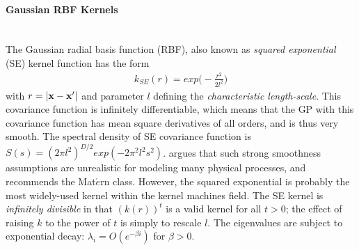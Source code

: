 \documentclass[11pt]{article}
\begin{document}
\paragraph{Gaussian RBF Kernels}\mbox{}\\
The Gaussian radial basis function (RBF), also known as \textsl{squared exponential} (SE) kernel function has the form
\begin{align*}
k_{SE}(r)=exp\Big(-\frac{r^2}{2l^2}\Big)
\end{align*}
with $r=|{\bf x}-{\bf x}'|$ and parameter $l$ defining the \textsl{characteristic length-scale}. This covariance function is infinitely differentiable, which means that the GP with this covariance function has mean square derivatives of all orders, and is thus very smooth. The spectral density of SE covariance function is $S(s)=(2\pi l^2)^{D/2}exp(-2\pi^2l^2s^2)$. \citep{stein_interpolation_1999} argues that such strong smoothness assumptions are unrealistic for modeling many physical processes, and recommends the Mat$\acute{e}$rn class. However, the squared exponential is probably the most widely-used kernel within the kernel machines field. The SE kernel is \textsl{infinitely divisible} in that $(k(r))^t$ is a valid kernel for all $t>0$; the effect of raising $k$ to the power of $t$ is simply to rescale $l$. The eigenvalues are subject to exponential decay: $\lambda_i=O(e^{-\beta i})$ for $\beta>0$.
\end{document}
